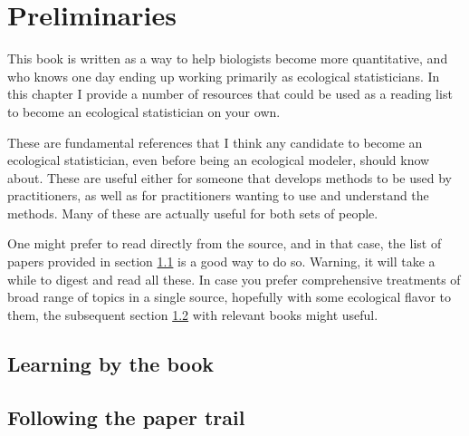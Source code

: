 \documentclass[
]{book}
\begin{document}
\chapter{Preliminaries}\label{prelim}

This book is written as a way to help biologists become more quantitative, and who knows one day ending up working primarily as ecological statisticians. In this chapter I provide a number of resources that could be used as a reading list to become an ecological statistician on your own.

These are fundamental references that I think any candidate to become an ecological statistician, even before being an ecological modeler, should know about. These are useful either for someone that develops methods to be used by practitioners, as well as for practitioners wanting to use and understand the methods. Many of these are actually useful for both sets of people.

One might prefer to read directly from the source, and in that case, the list of papers provided in section \ref{lbtb} is a good way to do so. Warning, it will take a while to digest and read all these. In case you prefer comprehensive treatments of broad range of topics in a single source, hopefully with some ecological flavor to them, the subsequent section \ref{ftpt} with relevant books might useful.

\section{Learning by the book}\label{lbtb}

\citet{Zuur2009a}

\citet{Zuur2007}

\citet{Zuur2009b}

\citet{Faraway2006}

\section{Following the paper trail}\label{ftpt}
\end{document}
